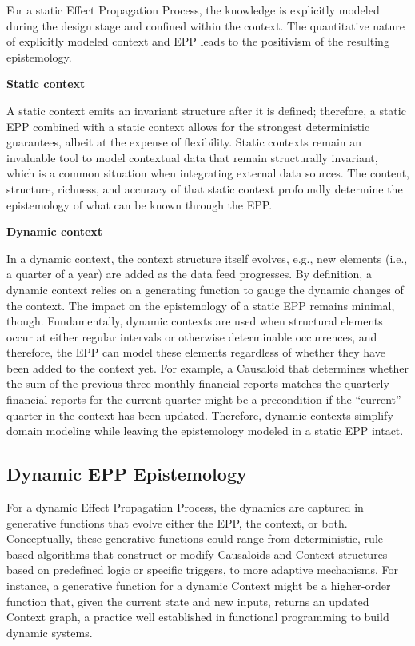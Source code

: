 For a static Effect Propagation Process, the knowledge is explicitly modeled during the design stage and confined within the context. The quantitative nature of explicitly modeled context and EPP leads to the positivism of the resulting epistemology.

\textbf{Static context}

A static context emits an invariant structure after it is defined; therefore, a static EPP combined with a static context allows for the strongest deterministic guarantees, albeit at the expense of flexibility. Static contexts remain an invaluable tool to model contextual data that remain structurally invariant, which is a common situation when integrating external data sources. The content, structure, richness, and accuracy of that static context profoundly determine the epistemology of what can be known through the EPP.

\textbf{Dynamic context}

In a dynamic context, the context structure itself evolves, e.g., new elements (i.e., a quarter of a year) are added as the data feed progresses. By definition, a dynamic context relies on a generating function to gauge the dynamic changes of the context. The impact on the epistemology of a static EPP remains minimal, though.
Fundamentally, dynamic contexts are used when structural elements occur at either regular intervals or otherwise determinable occurrences, and therefore, the EPP can model these elements regardless of whether they have been added to the context yet.
For example, a Causaloid that determines whether the sum of the previous three monthly financial reports matches the quarterly financial reports for the current quarter might be a precondition if the “current” quarter in the context has been updated. Therefore, dynamic contexts simplify domain modeling while leaving the epistemology modeled in a static EPP intact.

\subsection{Dynamic EPP Epistemology}

For a dynamic Effect Propagation Process, the dynamics are captured in generative functions that evolve either the EPP, the context, or both. Conceptually, these generative functions could range from deterministic, rule-based algorithms that construct or modify Causaloids and Context structures based on predefined logic or specific triggers, to more adaptive mechanisms. For instance, a generative function for a dynamic Context might be a higher-order function that, given the current state and new inputs, returns an updated Context graph, a practice well established in functional programming to build dynamic systems.

